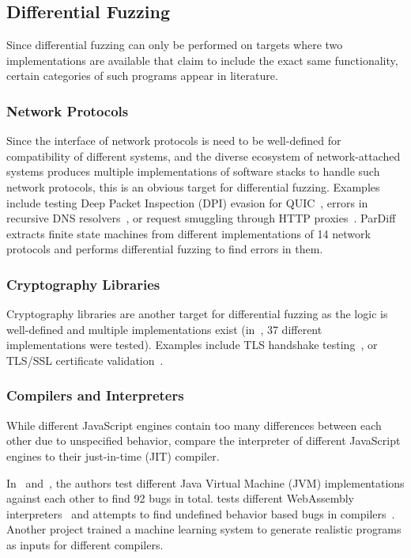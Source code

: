 \documentclass{article}
\let\savedCite=\cite
\renewcommand{\cite}{\unskip~\savedCite}
\begin{document}
\begin{multicols}{2}
    \subsection{Differential Fuzzing}

    Since differential fuzzing can only be performed on targets where two implementations are available that claim to include the exact same functionality, certain categories of such programs appear in literature.

    \subsubsection{Network Protocols}

    Since the interface of network protocols is need to be well-defined for compatibility of different systems, and the diverse ecosystem of network-attached systems produces multiple implementations of software stacks to handle such network protocols, this is an obvious target for differential fuzzing. Examples include testing Deep Packet Inspection (DPI) evasion for QUIC\cite{DPIFuzz}, errors in recursive DNS resolvers\cite{ResolFuzz}, or request smuggling through HTTP proxies\cite{T-Reqs}. ParDiff extracts finite state machines from different implementations of 14 network protocols and performs differential fuzzing to find errors in them.\cite{ParDiff}

    \subsubsection{Cryptography Libraries}

    Cryptography libraries are another target for differential fuzzing as the logic is well-defined and multiple implementations exist (in\cite{TLS}, 37 different implementations were tested). Examples include TLS handshake testing\cite{ExploitingDissent, TLS}, or TLS/SSL certificate validation\cite{NEZHA}.

    \subsubsection{Compilers and Interpreters}

    While different JavaScript engines contain too many differences between each other due to unspecified behavior, \citeauthor{JIT-Picking} compare the interpreter of different JavaScript engines to their just-in-time (JIT) compiler.\cite{JIT-Picking}

    In\cite{JVM} and\cite{JVM2}, the authors test different Java Virtual Machine (JVM) implementations against each other to find 92 bugs in total. \citeauthor{WASM} tests different WebAssembly interpreters\cite{WASM} and \citeauthor{UndefinedBehavior} attempts to find undefined behavior based bugs in compilers\cite{UndefinedBehavior}. Another project trained a machine learning system to generate realistic programs as inputs for different compilers.\cite{CompilerDL}


\end{multicols}
\end{document}
